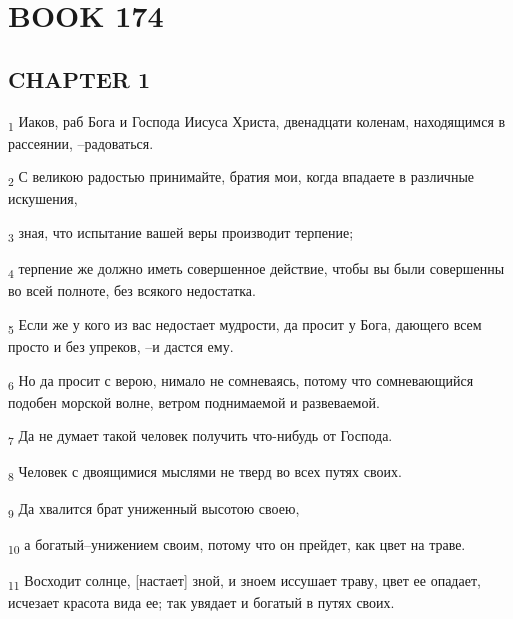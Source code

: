 \section{BOOK 174}
\subsection{CHAPTER 1}
\begin{tcolorbox}
\textsubscript{1} Иаков, раб Бога и Господа Иисуса Христа, двенадцати коленам, находящимся в рассеянии, --радоваться.
\end{tcolorbox}
\begin{tcolorbox}
\textsubscript{2} С великою радостью принимайте, братия мои, когда впадаете в различные искушения,
\end{tcolorbox}
\begin{tcolorbox}
\textsubscript{3} зная, что испытание вашей веры производит терпение;
\end{tcolorbox}
\begin{tcolorbox}
\textsubscript{4} терпение же должно иметь совершенное действие, чтобы вы были совершенны во всей полноте, без всякого недостатка.
\end{tcolorbox}
\begin{tcolorbox}
\textsubscript{5} Если же у кого из вас недостает мудрости, да просит у Бога, дающего всем просто и без упреков, --и дастся ему.
\end{tcolorbox}
\begin{tcolorbox}
\textsubscript{6} Но да просит с верою, нимало не сомневаясь, потому что сомневающийся подобен морской волне, ветром поднимаемой и развеваемой.
\end{tcolorbox}
\begin{tcolorbox}
\textsubscript{7} Да не думает такой человек получить что-нибудь от Господа.
\end{tcolorbox}
\begin{tcolorbox}
\textsubscript{8} Человек с двоящимися мыслями не тверд во всех путях своих.
\end{tcolorbox}
\begin{tcolorbox}
\textsubscript{9} Да хвалится брат униженный высотою своею,
\end{tcolorbox}
\begin{tcolorbox}
\textsubscript{10} а богатый--унижением своим, потому что он прейдет, как цвет на траве.
\end{tcolorbox}
\begin{tcolorbox}
\textsubscript{11} Восходит солнце, [настает] зной, и зноем иссушает траву, цвет ее опадает, исчезает красота вида ее; так увядает и богатый в путях своих.
\end{tcolorbox}
